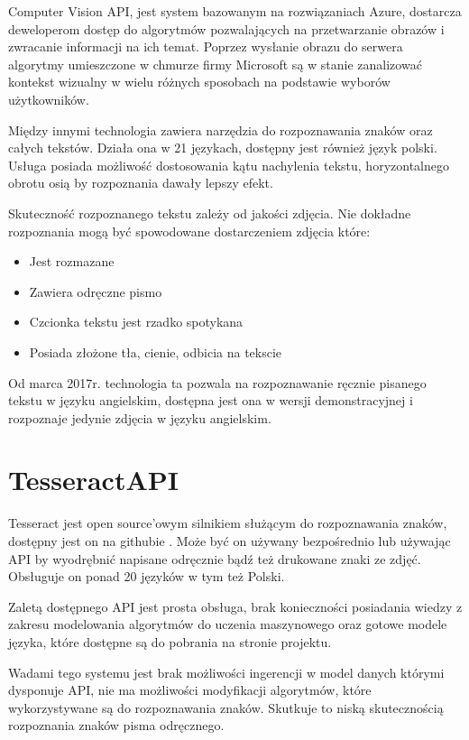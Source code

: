 \documentclass[brudnopis]{xmgr}
\begin{document}
Computer Vision API, jest system bazowanym na rozwiązaniach Azure, dostarcza deweloperom dostęp do algorytmów pozwalających na przetwarzanie obrazów i zwracanie informacji na ich temat. Poprzez wysłanie obrazu do serwera algorytmy umieszczone w chmurze firmy Microsoft są w stanie zanalizować kontekst wizualny w wielu różnych sposobach na podstawie wyborów użytkowników.

Między innymi technologia zawiera narzędzia do rozpoznawania znaków oraz całych tekstów. Działa ona w 21 językach, dostępny jest również język polski. Usługa posiada możliwość dostosowania kątu nachylenia tekstu, horyzontalnego obrotu osią by rozpoznania dawały lepszy efekt. 

Skuteczność rozpoznanego tekstu zależy od jakości zdjęcia. Nie dokładne rozpoznania mogą być spowodowane dostarczeniem zdjęcia które:

\begin{itemize}
\item
Jest rozmazane
\item
Zawiera odręczne pismo
\item
Czcionka tekstu jest rzadko spotykana
\item
Posiada złożone tła, cienie, odbicia na tekscie
\end{itemize}

Od marca 2017r. technologia ta pozwala na rozpoznawanie ręcznie pisanego tekstu w języku angielskim, dostępna jest ona w wersji demonstracyjnej i rozpoznaje jedynie zdjęcia w języku angielskim.

\section{TesseractAPI}

Tesseract jest open source'owym silnikiem służącym do rozpoznawania znaków, dostępny jest on na githubie\cite{1} . Może być on używany bezpośrednio lub używając API by wyodrębnić napisane odręcznie bądź też drukowane znaki ze zdjęć. Obsługuje on ponad 20 języków w tym też Polski.

Zaletą dostępnego API jest prosta obsługa, brak konieczności posiadania wiedzy z zakresu modelowania algorytmów do uczenia maszynowego oraz gotowe modele języka, które dostępne są do pobrania na stronie projektu.

Wadami tego systemu jest brak możliwości ingerencji w model danych którymi dysponuje API, nie ma możliwości modyfikacji algorytmów, które wykorzystywane są do rozpoznawania znaków. Skutkuje to niską skutecznością rozpoznania znaków pisma odręcznego.
\end{document}
